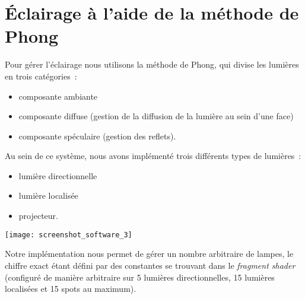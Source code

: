 \section{Éclairage à l'aide de la méthode de Phong}

Pour gérer l'éclairage nous utilisons la méthode de Phong, qui divise les lumières en trois catégories~:
\begin{itemize}
    \item composante ambiante
    \item composante diffuse (gestion de la diffusion de la lumière au sein d'une face)
    \item composante spéculaire (gestion des reflets).
\end{itemize}

Au sein de ce système, nous avons implémenté trois différents types de lumières~:
\begin{itemize}
    \item lumière directionnelle
    \item lumière localisée
    \item projecteur.
\end{itemize}

{\centering \texttt{[image: screenshot\_software\_3]}}

Notre implémentation nous permet de gérer un nombre arbitraire de lampes, le chiffre exact étant défini par des constantes
se trouvant dans le \textit{fragment shader} (configuré de manière arbitraire sur 5 lumières directionnelles, 15 lumières localisées et 15 spots au maximum).

